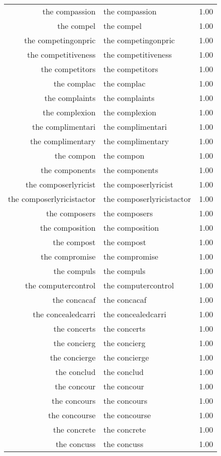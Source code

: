 \begin{table}[ht]
\begin{tabular}{rlr}
  the compassion & the compassion & 1.00 \\ 
  the compel & the compel & 1.00 \\ 
  the competingonpric & the competingonpric & 1.00 \\ 
  the competitiveness & the competitiveness & 1.00 \\ 
  the competitors & the competitors & 1.00 \\ 
  the complac & the complac & 1.00 \\ 
  the complaints & the complaints & 1.00 \\ 
  the complexion & the complexion & 1.00 \\ 
  the complimentari & the complimentari & 1.00 \\ 
  the complimentary & the complimentary & 1.00 \\ 
  the compon & the compon & 1.00 \\ 
  the components & the components & 1.00 \\ 
  the composerlyricist & the composerlyricist & 1.00 \\ 
  the composerlyricistactor & the composerlyricistactor & 1.00 \\ 
  the composers & the composers & 1.00 \\ 
  the composition & the composition & 1.00 \\ 
  the compost & the compost & 1.00 \\ 
  the compromise & the compromise & 1.00 \\ 
  the compuls & the compuls & 1.00 \\ 
  the computercontrol & the computercontrol & 1.00 \\ 
  the concacaf & the concacaf & 1.00 \\ 
  the concealedcarri & the concealedcarri & 1.00 \\ 
  the concerts & the concerts & 1.00 \\ 
  the concierg & the concierg & 1.00 \\ 
  the concierge & the concierge & 1.00 \\ 
  the conclud & the conclud & 1.00 \\ 
  the concour & the concour & 1.00 \\ 
  the concours & the concours & 1.00 \\ 
  the concourse & the concourse & 1.00 \\ 
  the concrete & the concrete & 1.00 \\ 
  the concuss & the concuss & 1.00 \\ 

\end{tabular}
\end{table}
